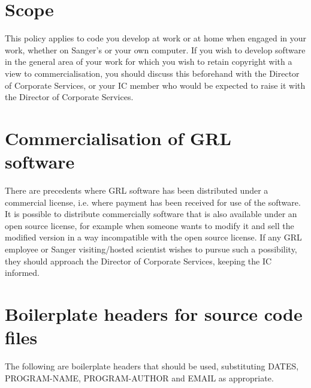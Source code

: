 \documentclass[10pt,a4paper]{article}
\begin{document}
\section{Scope}

This policy applies to code you develop at work or at home when engaged in your 
work, whether on Sanger's or your own computer. If you wish to develop software in 
the general area of your work for which you wish to retain copyright with a view to 
commercialisation, you should discuss this beforehand with the Director of Corporate 
Services, or your IC member who would be expected to raise it with the Director of 
Corporate Services.


\section{Commercialisation of GRL software}

There are precedents where GRL software has been distributed under a commercial 
license, i.e. where payment has been received for use of the software. It is possible to 
distribute commercially software that is also available under an open source license, for 
example when someone wants to modify it and sell the modified version in a way 
incompatible with the open source license. If any GRL employee or Sanger 
visiting/hosted scientist wishes to pursue such a possibility, they should approach the 
Director of Corporate Services, keeping the IC informed. 


\appendix

\section{Boilerplate headers for source code files}

The following are boilerplate headers that should be used, substituting DATES, PROGRAM-NAME, PROGRAM-AUTHOR and EMAIL as appropriate.
\end{document}
